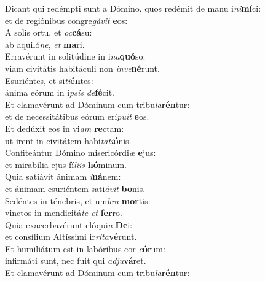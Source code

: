 \evenverse Dicant qui redémpti sunt a Dómino, quos redémit de manu i\textit{ni}\textbf{mí}ci:~\*\\
\evenverse et de regiónibus congre\textit{gá}\textit{vit} \textbf{e}os:\\
\oddverse A solis ortu, et \textit{oc}\textbf{cá}su:~\*\\
\oddverse ab aquiló\textit{ne}, \textit{et} \textbf{ma}ri.\\
\evenverse Erravérunt in solitúdine in i\textit{na}\textbf{quó}so:~\*\\
\evenverse viam civitátis habitáculi non \textit{in}\textit{ve}\textbf{né}runt.\\
\oddverse Esuriéntes, et si\textit{ti}\textbf{én}tes:~\*\\
\oddverse ánima eórum in i\textit{psis} \textit{de}\textbf{fé}cit.\\
\evenverse Et clamavérunt ad Dóminum cum tribu\textit{la}\textbf{rén}tur:~\*\\
\evenverse et de necessitátibus eórum erí\textit{pu}\textit{it} \textbf{e}os.\\
\oddverse Et dedúxit eos in vi\textit{am} \textbf{re}ctam:~\*\\
\oddverse ut irent in civitátem habi\textit{ta}\textit{ti}\textbf{ó}nis.\\
\evenverse Confiteántur Dómino misericórdi\textit{æ} \textbf{e}jus:~\*\\
\evenverse et mirabília ejus fí\textit{li}\textit{is} \textbf{hó}minum.\\
\oddverse Quia satiávit ánimam \textit{i}\textbf{ná}nem:~\*\\
\oddverse et ánimam esuriéntem sati\textit{á}\textit{vit} \textbf{bo}nis.\\
\evenverse Sedéntes in ténebris, et um\textit{bra} \textbf{mor}tis:~\*\\
\evenverse vinctos in mendicitá\textit{te} \textit{et} \textbf{fer}ro.\\
\oddverse Quia exacerbavérunt elóqui\textit{a} \textbf{De}i:~\*\\
\oddverse et consílium Altíssimi ir\textit{ri}\textit{ta}\textbf{vé}runt.\\
\evenverse Et humiliátum est in labóribus cor \textit{e}\textbf{ó}rum:~\*\\
\evenverse infirmáti sunt, nec fuit qui \textit{ad}\textit{ju}\textbf{vá}ret.\\
\oddverse Et clamavérunt ad Dóminum cum tribu\textit{la}\textbf{rén}tur:~\*\\
